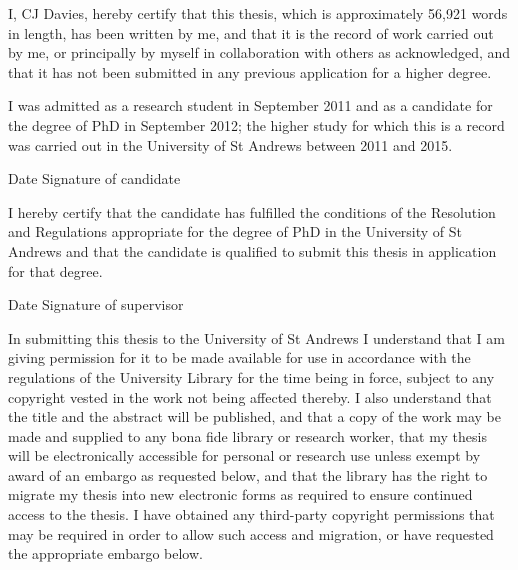 

I, CJ Davies, hereby certify that this thesis, which is approximately 56,921 words in length, has been written by me, and that it is the record of work carried out by me, or principally by myself in collaboration with others as acknowledged, and that it has not been submitted in any previous application for a higher degree. 

I was admitted as a research student in September 2011 and as a candidate for the degree of PhD in September 2012; the higher study for which this is a record was carried out in the University of St Andrews between 2011 and 2015. 

\vspace{5mm}

Date \hspace{35mm} Signature of candidate

\vspace{10mm}



I hereby certify that the candidate has fulfilled the conditions of the Resolution and Regulations appropriate for the degree of PhD in the University of St Andrews and that the candidate is qualified to submit this thesis in application for that degree. 

\vspace{5mm}

Date \hspace{35mm} Signature of supervisor

\vspace{10mm}



In submitting this thesis to the University of St Andrews I understand that I am giving permission for it to be made available for use in accordance with the regulations of the University Library for the time being in force, subject to any copyright vested in the work not being affected thereby.  I also understand that the title and the abstract will be published, and that a copy of the work may be made and supplied to any bona fide library or research worker, that my thesis will be electronically accessible for personal or research use unless exempt by award of an embargo as requested below, and that the library has the right to migrate my thesis into new electronic forms as required to ensure continued access to the thesis. I have obtained any third-party copyright permissions that may be required in order to allow such access and migration, or have requested the appropriate embargo below. 

